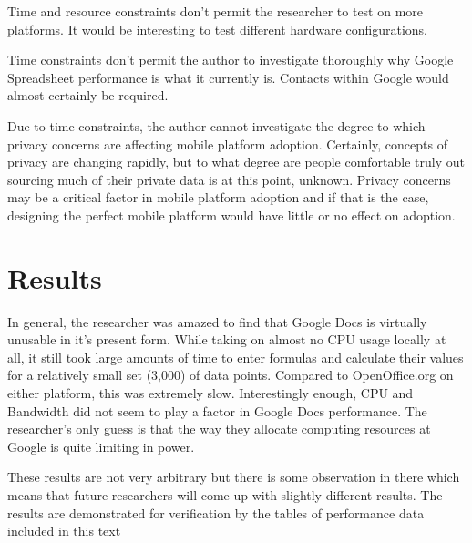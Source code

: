 Time and resource constraints don't permit the researcher to test on more
platforms.  It would be interesting to test different hardware configurations.

Time constraints don't permit the author to investigate thoroughly why Google
Spreadsheet performance is what it currently is.  Contacts within Google would
almost certainly be required.

Due to time constraints, the author cannot investigate the degree to which
privacy concerns are affecting mobile platform adoption.  Certainly, concepts of
privacy are changing rapidly, but to what degree are people comfortable truly
out sourcing much of their private data is at this point, unknown.  Privacy
concerns may be a critical factor in mobile platform adoption and if that is the
case, designing the perfect mobile platform would have little or no effect on
adoption.

\section{Results}

In general, the researcher was amazed to find that Google Docs is virtually
unusable in it's present form.  While taking on almost no CPU usage locally at
all, it still took large amounts of time to enter formulas and calculate their
values for a relatively small set (3,000) of data points.  Compared to
OpenOffice.org on either platform, this was extremely slow.  Interestingly
enough, CPU and Bandwidth did not seem to play a factor in Google Docs
performance.  The researcher's only guess is that the way they allocate
computing resources at Google is quite limiting in power.

These results are not very arbitrary but there is some observation in there
which means that future researchers will come up with slightly different
results.  The results are demonstrated for verification by the tables of
performance data included in this text
